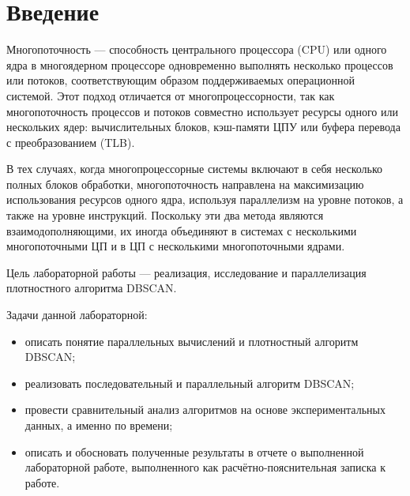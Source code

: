 \chapter*{Введение}

Многопоточность --- способность центрального процессора (CPU) или одного ядра в многоядерном процессоре одновременно выполнять несколько процессов или потоков, соответствующим образом поддерживаемых операционной системой.
Этот подход отличается от многопроцессорности, так как многопоточность процессов и потоков совместно использует ресурсы одного или нескольких ядер: вычислительных блоков, кэш-памяти ЦПУ или буфера перевода с преобразованием (TLB).

В тех случаях, когда многопроцессорные системы включают в себя несколько полных блоков обработки, многопоточность направлена на максимизацию использования ресурсов одного ядра, используя параллелизм на уровне потоков, а также на уровне инструкций.
Поскольку эти два метода являются взаимодополняющими, их иногда объединяют в системах с несколькими многопоточными ЦП и в ЦП с несколькими многопоточными ядрами.

Цель лабораторной работы --- реализация, исследование и параллелизация плотностного алгоритма DBSCAN.

\newpage

Задачи данной лабораторной:

\begin{itemize}
	\item описать понятие параллельных вычислений и плотностный алгоритм DBSCAN;
	\item реализовать последовательный и параллельный алгоритм DBSCAN;
	\item провести сравнительный анализ алгоритмов на основе экспериментальных данных, а именно по времени;
	\item описать и обосновать полученные результаты в отчете о выполненной лабораторной работе, выполненного как расчётно-пояснительная записка к работе.
\end{itemize}